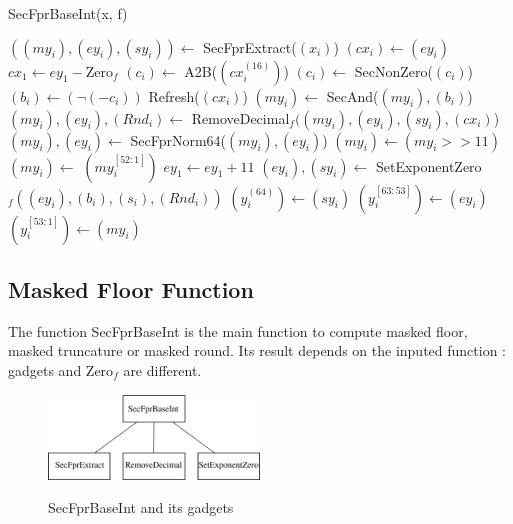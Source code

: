 \documentclass[runningheads]{llncs}
\begin{document}
\begin{algorithm}
    \caption{SecFprBaseInt(x, f)}
    \label{algo:SecFprBaseInt}
    $((my_i), (ey_i), (sy_i)) \leftarrow$ SecFprExtract($(x_i)$)\;%
    $(cx_i) \leftarrow (ey_i)$\;
    $cx_1 \leftarrow ey_1 - \text{Zero}_f$\;%
    $(c_i) \leftarrow$ A2B($(cx_i^{(16)})$)\; 
    $(c_i) \leftarrow$ SecNonZero($(c_i)$)
    $(b_i) \leftarrow (\neg(-c_i))$\;
    Refresh($(cx_i)$)\;
    $(my_i) \leftarrow$ SecAnd($(my_i), (b_i)$)\;%
    $(my_i), (ey_i), (Rnd_i) \leftarrow$ RemoveDecimal$_f((my_i), (ey_i), (sy_i), (cx_i)$)\;%
    $(my_i), (ey_i) \leftarrow$ SecFprNorm64($(my_i),(ey_i)$)\;
    $(my_i) \leftarrow (my_i >> 11)$\;
    $(my_i) \leftarrow$ $(my_i^{[52:1]}) $\;
    $ey_1 \leftarrow ey_1 + 11$\;
    $(ey_i), (sy_i) \leftarrow$ SetExponentZero$_f((ey_i), (b_i), (s_i), (Rnd_i))$\;%
    $(y_i^{(64)}) \leftarrow (sy_i) $\;
    $(y_i^{[63:53]}) \leftarrow (ey_i) $\;
    $(y_i^{[53:1]}) \leftarrow (my_i) $\;
  \;
  \end{algorithm}


  \subsection{Masked Floor Function}
  The function SecFprBaseInt is the main function to compute masked floor, masked truncature or masked round. Its result depends on the inputed function : gadgets and Zero$_f$ are different. 
  \begin{figure}[!ht]
      \centering
      \includegraphics[width=0.5\textwidth]{figure/secpfrhierarchie.pdf}
      \label{fig:hierar}
      \caption{SecFprBaseInt and its gadgets}
  \end{figure}
\end{document}
